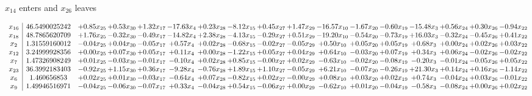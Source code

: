 \documentclass[9pt]{article}
\begin{document}
 $ x_{14} $ enters and $ x_{26} $ leaves 

 \[\begin{array}{c| c c@{\hskip 2pt} c@{\hskip 2pt} c@{\hskip 2pt} c@{\hskip 2pt} c@{\hskip 2pt} c@{\hskip 2pt} c@{\hskip 2pt} c@{\hskip 2pt} c@{\hskip 2pt} c@{\hskip 2pt} c@{\hskip 2pt} c@{\hskip 2pt} c@{\hskip 2pt} c@{\hskip 2pt} c@{\hskip 2pt} }
 x_{16}   &  46.5490025242 & +  0.85 x_{25} & +  0.53 x_{30} & +  1.32 x_{17} & -17.63 x_{4} & +  0.23 x_{28} & -8.12 x_{15} & +  0.45 x_{27} & +  1.47 x_{29} & -16.57 x_{10} & -1.67 x_{20} & -0.60 x_{19} & -15.48 x_{3} & +  0.56 x_{24} & +  0.30 x_{26} & -0.94 x_{22}\\
 x_{18}   &  48.7865620709 & +  1.76 x_{25} & -0.32 x_{30} & -0.49 x_{17} & -14.82 x_{4} & +  2.38 x_{28} & -4.13 x_{15} & -0.29 x_{27} & +  0.51 x_{29} & -19.20 x_{10} & -0.54 x_{20} & -0.73 x_{19} & + 16.03 x_{3} & -0.32 x_{24} & -0.45 x_{26} & +  0.41 x_{22}\\
 x_{2}   &  1.31559160012 & -0.04 x_{25} & +  0.04 x_{30} & -0.05 x_{17} & +  0.57 x_{4} & +  0.02 x_{28} & -0.68 x_{15} & -0.02 x_{27} & -0.05 x_{29} & +  0.50 x_{10} & +  0.05 x_{20} & +  0.05 x_{19} & +  0.68 x_{3} & +  0.00 x_{24} & +  0.02 x_{26} & +  0.03 x_{22}\\
 x_{12}   &  3.24999928356 & +  0.00 x_{25} & +  0.07 x_{30} & +  0.05 x_{17} & +  0.11 x_{4} & +  0.00 x_{28} & -1.22 x_{15} & +  0.05 x_{27} & +  0.04 x_{29} & +  0.64 x_{10} & -0.03 x_{20} & +  0.07 x_{19} & +  0.34 x_{3} & +  0.06 x_{24} & -0.02 x_{26} & -0.02 x_{22}\\
 x_{7}   &  1.47326908249 & +  0.01 x_{25} & -0.03 x_{30} & -0.01 x_{17} & -0.10 x_{4} & +  0.02 x_{28} & +  0.85 x_{15} & -0.00 x_{27} & +  0.02 x_{29} & -0.63 x_{10} & -0.02 x_{20} & -0.08 x_{19} & -0.20 x_{3} & -0.01 x_{24} & -0.05 x_{26} & +  0.05 x_{22}\\
 x_{23}   &  36.3992183403 & -0.92 x_{25} & +  1.15 x_{30} & +  0.36 x_{17} & -9.28 x_{4} & -0.76 x_{28} & +  1.89 x_{15} & +  1.10 x_{27} & -0.05 x_{29} & +  6.21 x_{10} & -0.07 x_{20} & -0.26 x_{19} & + 21.30 x_{3} & +  0.14 x_{24} & +  0.16 x_{26} & -1.14 x_{22}\\
 x_{6}   &  1.460656853 & +  0.02 x_{25} & +  0.01 x_{30} & -0.03 x_{17} & -0.64 x_{4} & +  0.07 x_{28} & -0.82 x_{15} & +  0.02 x_{27} & -0.00 x_{29} & +  0.08 x_{10} & +  0.03 x_{20} & +  0.02 x_{19} & +  0.74 x_{3} & -0.04 x_{24} & +  0.03 x_{26} & -0.01 x_{22}\\
 x_{9}   &  1.49946516971 & -0.04 x_{25} & -0.06 x_{30} & -0.07 x_{17} & +  0.33 x_{4} & -0.04 x_{28} & +  0.54 x_{15} & -0.06 x_{27} & +  0.00 x_{29} & -0.62 x_{10} & +  0.01 x_{20} & -0.04 x_{19} & -0.58 x_{3} & -0.08 x_{24} & +  0.00 x_{26} & +  0.02 x_{22}\\

\end{array}\]
\end{document}

